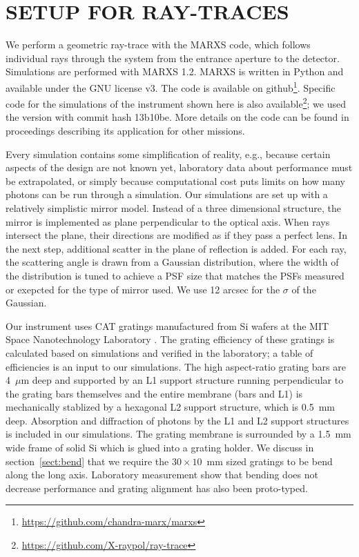 \documentclass[]{spie}  %
\begin{document}
\section{SETUP FOR RAY-TRACES}
We perform a geometric ray-trace with the MARXS code, which follows
individual rays through the system from the entrance aperture to the
detector. Simulations are performed with MARXS
1.2\cite{marxs,marxs1.2}. MARXS is written in Python and available
under the GNU license v3. The code is available on
github\footnote{\url{https://github.com/chandra-marx/marxs}}. Specific
code for the simulations of the instrument shown here is also
available\footnote{\url{https://github.com/X-raypol/ray-trace}}; we
used the version with commit hash 13b10be. More details on the code
can be found in proceedings describing its application for other
missions\cite{10.1117/12.2525814,10.1117/12.2312678}.

Every simulation contains some simplification of reality, e.g.,
because certain aspects of the design are not known yet, laboratory
data about performance must be extrapolated, or simply because
computational cost puts limits on how many photons can be run through
a simulation. Our simulations are set up with a relatively simplistic
mirror model. Instead of a three dimensional structure, the mirror is
implemented as plane perpendicular to the optical axis. When rays
intersect the plane, their directions are modified as if they pass a
perfect lens. In the next step, additional scatter in the plane of
reflection is added. For each ray, the scattering angle is drawn from
a Gaussian distribution, where the width of the distribution is tuned
to achieve a PSF size that matches the PSFs measured or exepcted for
the type of mirror used. We use 12 arcsec for the $\sigma$ of the
Gaussian.

Our instrument uses CAT gratings manufactured from Si wafers at the
MIT Space Nanotechnology Laboratory
\cite{Heilmann:11,doi:10.1117/12.2188525,10.1117/12.2314180,10.1117/12.2529354}. The
grating efficiency of these gratings is calculated based on
simulations and verified in the laboratory; a table of efficiencies is
an input to our simulations. The high aspect-ratio grating bars are
4~$\mu$m deep and supported by an L1 support structure running
perpendicular to the grating bars themselves and the entire membrane
(bars and L1) is mechanically stablized by a hexagonal L2 support
structure, which is 0.5~mm deep. Absorption and diffraction of photons
by the L1 and L2 support structures is included in our
simulations. The grating membrane is surrounded by a 1.5~mm wide frame
of solid Si which is glued into a grating holder. We discuss in
section~\ref{sect:bend} that we require the $30\times10$~mm sized
gratings to be bend along the long axis. Laboratory measurement show
that bending does not decrease performance\cite{10.1117/12.2274205}
and grating alignment has also been
proto-typed\cite{10.1117/12.2314902,10.1117/12.2529607}.
\end{document}
